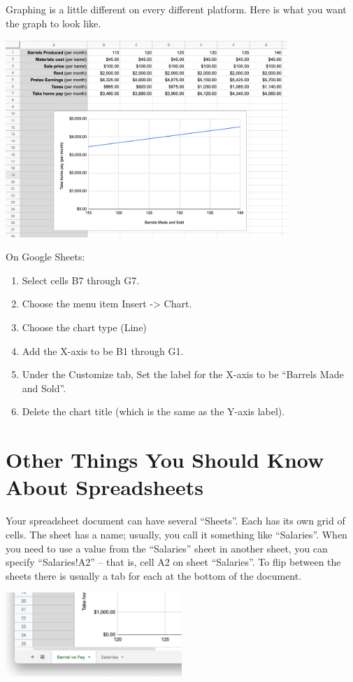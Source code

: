 Graphing is a little different on every different platform.  Here is what you want the graph to look like.

\includegraphics[width=0.8\textwidth]{BarrelGraph.png}

On Google Sheets:

\begin{enumerate}
\item Select cells B7 through G7. 
\item Choose the menu item Insert -> Chart.
\item Choose the chart type (Line)
\item Add the X-axis to be B1 through G1.
\item Under the Customize tab, Set the label for the X-axis to be ``Barrels Made and Sold''.
\item Delete the chart title (which is the same as the Y-axis label).
\end{enumerate}

\section{Other Things You Should Know About Spreadsheets}

Your spreadsheet document can have several ``Sheets''.  Each has its
own grid of cells.  The sheet has a name; usually, you call it
something like ``Salaries''.  When you need to use a value from the
``Salaries'' sheet in another sheet, you can specify ``Salaries!A2''
-- that is, cell A2 on sheet ``Salaries''.  To flip between the sheets
there is usually a tab for each at the bottom of the document.

\includegraphics[width=0.5\textwidth]{Sheets.png}

